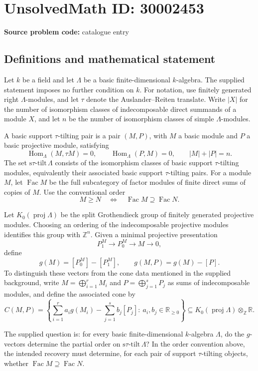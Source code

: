 \documentclass[11pt]{article}
\newcommand{\Z}{\mathbb{Z}}
\newcommand{\R}{\mathbb{R}}
\begin{document}
\section*{UnsolvedMath ID: 30002453}
\textbf{Source problem code:} catalogue entry
\subsection{Definitions and mathematical statement}
Let \(k\) be a field and let \(\Lambda\) be a basic finite-dimensional \(k\)-algebra. The supplied statement imposes no further condition on \(k\). For notation, use finitely generated right \(\Lambda\)-modules, and let \(\tau\) denote the Auslander--Reiten translate. Write \(|X|\) for the number of isomorphism classes of indecomposable direct summands of a module \(X\), and let \(n\) be the number of isomorphism classes of simple \(\Lambda\)-modules.

A basic support \(\tau\)-tilting pair is a pair \((M,P)\), with \(M\) a basic module and \(P\) a basic projective module, satisfying
\[
\operatorname{Hom}_{\Lambda}(M,\tau M)=0,\qquad
\operatorname{Hom}_{\Lambda}(P,M)=0,\qquad
|M|+|P|=n.
\]
The set \(\mathrm{s}\tau\text{-}\mathrm{tilt}\,\Lambda\) consists of the isomorphism classes of basic support \(\tau\)-tilting modules, equivalently their associated basic support \(\tau\)-tilting pairs. For a module \(M\), let \(\operatorname{Fac}M\) be the full subcategory of factor modules of finite direct sums of copies of \(M\). Use the conventional order
\[
M\geq N\quad\Longleftrightarrow\quad
\operatorname{Fac}M\supseteq\operatorname{Fac}N.
\]

Let \(K_0(\operatorname{proj}\Lambda)\) be the split Grothendieck group of finitely generated projective modules. Choosing an ordering of the indecomposable projective modules identifies this group with \(\Z^n\). Given a minimal projective presentation
\[
P_1^M\longrightarrow P_0^M\longrightarrow M\longrightarrow0,
\]
define
\[
g(M)=[P_0^M]-[P_1^M],\qquad
g(M,P)=g(M)-[P].
\]
To distinguish these vectors from the cone data mentioned in the supplied background, write \(M=\bigoplus_{i=1}^{r}M_i\) and \(P=\bigoplus_{j=1}^{s}P_j\) as sums of indecomposable modules, and define the associated cone by
\[
C(M,P)=\left\{
\sum_{i=1}^{r}a_i g(M_i)-\sum_{j=1}^{s}b_j[P_j]
:\ a_i,b_j\in\R_{\geq0}
\right\}
\subseteq K_0(\operatorname{proj}\Lambda)\otimes_{\Z}\R.
\]

The supplied question is: for every basic finite-dimensional \(k\)-algebra \(\Lambda\), do the \(g\)-vectors determine the partial order on \(\mathrm{s}\tau\text{-}\mathrm{tilt}\,\Lambda\)? In the order convention above, the intended recovery must determine, for each pair of support \(\tau\)-tilting objects, whether \(\operatorname{Fac}M\supseteq\operatorname{Fac}N\).
\end{document}
